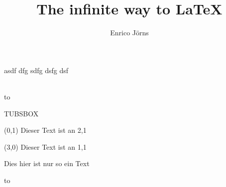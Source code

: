 \documentclass[a5paper,portrait]{scrreprt}
\renewcommand{\maketitle}{%
\setlength{\fboxsep}{0cm}%
\colorbox{tuSecondaryLight}{%
  \begin{minipage}[t][\textheight]{\textwidth}%
      \LARGE asdf dfg sdfg dsfg dsf
  \end{minipage}%
}
\vspace*{-0.75\tulogoHeight}\vspace{-\textheight}\\%
\hspace*{-5.5mm}%
\colorbox{tuRed}{%
\hbox to \tulogoWidth{\vbox to \tulogoHeight{\tubslogo}}%
}\vspace*{-0.25\tulogoHeight}\\%
}
\begin{document}
\author{Enrico Jörns}
\title{The infinite way to LaTeX}

\maketitle

\newpage

\begin{tubsbox}[tuBlueLight40]{3}{3}
  TUBSBOX
\end{tubsbox}


\begin{textblock}{3}(0,1)
Dieser Text ist an 2,1
\end{textblock}

\begin{textblock}{3}(3,0)
Dieser Text ist an 1,1
\end{textblock}


Dies hier ist nur so ein Text

\newpage


\newpage

\setlength{\fboxsep}{0cm}%
\colorbox{tuSecondaryLight}{%
\parbox{\textwidth}{\vbox to }%
}
\end{document}
